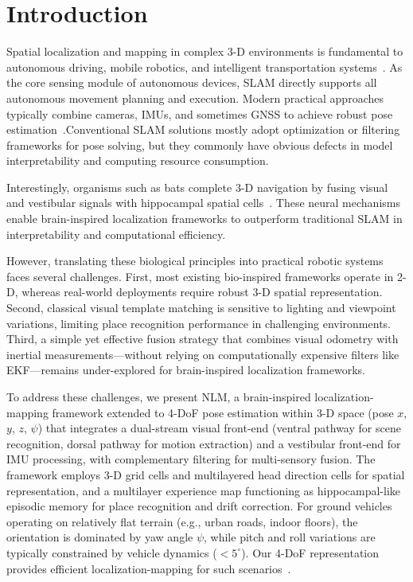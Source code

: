 \documentclass[preprint,12pt]{elsarticle}
\begin{document}
\section{Introduction}
\label{sec:intro}

Spatial localization and mapping in complex 3-D environments is fundamental to autonomous driving, mobile robotics, and intelligent transportation systems~\cite{cadena2016past}. As the core sensing module of autonomous devices, SLAM directly supports all autonomous movement planning and execution. Modern practical approaches typically combine cameras, IMUs, and sometimes GNSS to achieve robust pose estimation~\cite{saputra2018visual}.Conventional SLAM solutions mostly adopt optimization or filtering frameworks for pose solving, but they commonly have obvious defects in model interpretability and computing resource consumption.

Interestingly, organisms such as bats complete 3-D navigation by fusing visual and vestibular signals with hippocampal spatial cells~\cite{jeffery2013navigating,hafting2005microstructure,taube1990head,finkelstein2016three,solstad2008representation}. These neural mechanisms enable brain-inspired localization frameworks to outperform traditional SLAM in interpretability and computational efficiency.

However, translating these biological principles into practical robotic systems faces several challenges. First, most existing bio-inspired frameworks operate in 2-D, whereas real-world deployments require robust 3-D spatial representation. Second, classical visual template matching is sensitive to lighting and viewpoint variations, limiting place recognition performance in challenging environments. Third, a simple yet effective fusion strategy that combines visual odometry with inertial measurements---without relying on computationally expensive filters like EKF---remains under-explored for brain-inspired localization frameworks.

To address these challenges, we present NLM, a brain-inspired localization-mapping framework extended to 4-DoF pose estimation within 3-D space (pose $x$, $y$, $z$, $\psi$) that integrates a dual-stream visual front-end (ventral pathway for scene recognition, dorsal pathway for motion extraction) and a vestibular front-end for IMU processing, with complementary filtering for multi-sensory fusion. The framework employs 3-D grid cells and multilayered head direction cells for spatial representation, and a multilayer experience map functioning as hippocampal-like episodic memory for place recognition and drift correction. For ground vehicles operating on relatively flat terrain (e.g., urban roads, indoor floors), the orientation is dominated by yaw angle $\psi$, while pitch and roll variations are typically constrained by vehicle dynamics ($<5^\circ$). Our 4-DoF representation provides efficient localization-mapping for such scenarios~\cite{milford2004ratslam,milford2010persistent}.
\end{document}
